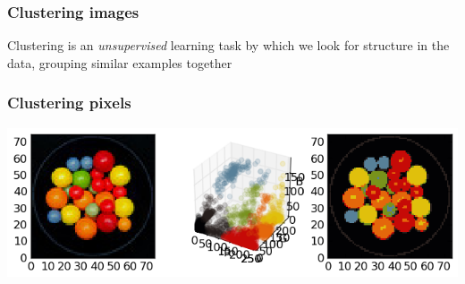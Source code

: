 \begin{frame}
  \frametitle{Clustering images}

  \begin{center}
    Clustering is an \textit{unsupervised} learning task by which we
    look for structure in the data, grouping similar examples together
    \vskip20pt
    \vskip20pt
  \end{center}

\end{frame}

\begin{frame}
  \frametitle{Clustering pixels}

  \begin{center}
  \includegraphics[width=\textwidth]{../../code/image_data/candy_clustered.png}
  \end{center}

\end{frame}


